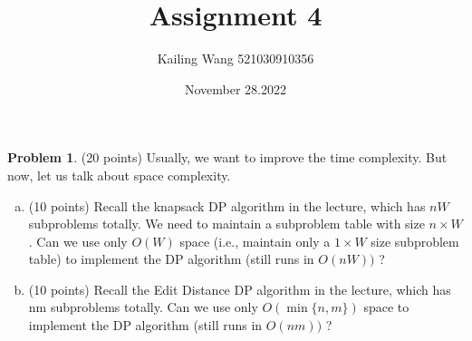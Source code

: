 \documentclass{article}
\theoremstyle{definition}
\newtheorem{prob}{Problem}
\begin{document}
	\title{Assignment 4}
	\author{Kailing Wang 521030910356}
	\date{November 28.2022}
	\maketitle
	\begin{prob}
		(20 points) Usually, we want to improve the time complexity. But now, let us talk about space complexity.
		\begin{enumerate}[(a)]
			\item (10 points) Recall the knapsack DP algorithm in the lecture, which has $n W$ subproblems totally. We need to maintain a subproblem table with size $n \times W$. Can we use only $O(W)$ space (i.e., maintain only a $1 \times W$ size subproblem table) to implement the DP algorithm (still runs in $O(n W))$ ?
			\item (10 points) Recall the Edit Distance DP algorithm in the lecture, which has $\mathrm{nm}$ subproblems totally. Can we use only $O(\min \{n, m\})$ space to implement the DP algorithm (still runs in $O(n m))$ ?
		\end{enumerate}
	\end{prob}
	
\end{document}
